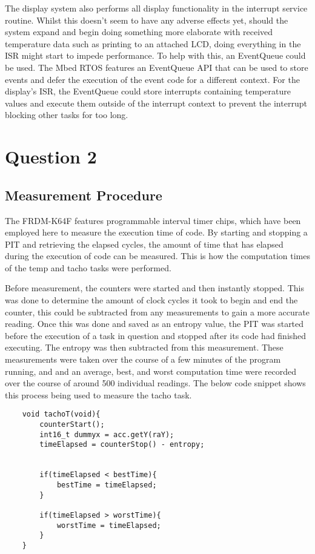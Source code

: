\documentclass[]{report}
\begin{document}
		The display system also performs all display functionality in the interrupt service routine. Whilst this doesn't seem to have any adverse effects yet, should the system expand and begin doing something more elaborate with received temperature data such as printing to an attached LCD, doing everything in the ISR might start to impede performance. To help with this, an EventQueue could be used. The Mbed RTOS features an EventQueue API\cite{mbedoseventqueue} that can be used to store events and defer the execution of the event code for a different context. For the display's ISR, the EventQueue could store interrupts containing temperature values and execute them outside of the interrupt context to prevent the interrupt blocking other tasks for too long.
		
		\section{Question 2}
			\subsection{Measurement Procedure}
			The FRDM-K64F features programmable interval timer chips, which have been employed here to measure the execution time of code. By starting and stopping a PIT and retrieving the elapsed cycles, the amount of time that has elapsed during the execution of code can be measured. This is how the computation times of the temp and tacho tasks were performed. 
			\medskip
			
			Before measurement, the counters were started and then instantly stopped. This was done to determine the amount of clock cycles it took to begin and end the counter, this could be subtracted from any measurements to gain a more accurate reading. Once this was done and saved as an entropy value, the PIT was started before the execution of a task in question and stopped after its code had finished executing. The entropy was then subtracted from this measurement. These measurements were taken over the course of a few minutes of the program running, and and an average, best, and worst computation time were recorded over the course of around 500 individual readings. The below code snippet shows this process being used to measure the tacho task.
			\begin{lstlisting}
	void tachoT(void){
		counterStart();
		int16_t dummyx = acc.getY(raY);
		timeElapsed = counterStop() - entropy;
			
			
		if(timeElapsed < bestTime){
			bestTime = timeElapsed;
		}
			
		if(timeElapsed > worstTime){
			worstTime = timeElapsed;
		}		
	}
			\end{lstlisting}
			
\end{document}
